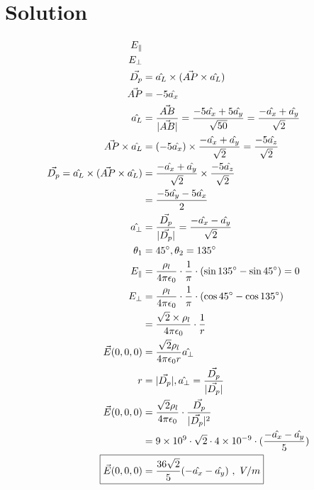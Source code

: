 \documentclass[12pt]{article}
\begin{document}
\section*{Solution}
\[
\begin{aligned}
    E_{\parallel} \\
    E_{\perp} \\
    \vec{D_p} &= \hat{a_L} \times (\vec{AP} \times \hat{a_L}) \\
    \vec{AP} &= -5\hat{a_x} \\
    \hat{a_L} &= \frac{\vec{AB}}{|\vec{AB}|} = \frac{-5\hat{a_x}+5\hat{a_y}}{\sqrt{50}} = \frac{-\hat{a_x}+\hat{a_y}}{\sqrt{2}} \\
    \vec{AP} \times \hat{a_L} &= (-5\hat{a_x}) \times \frac{-\hat{a_x}+\hat{a_y}}{\sqrt{2}} = \frac{-5\hat{a_z}}{\sqrt{2}} \\
    \vec{D_p} = \hat{a_L} \times (\vec{AP} \times \hat{a_L}) &= \frac{-\hat{a_x}+\hat{a_y}}{\sqrt{2}} \times \frac{-5\hat{a_z}}{\sqrt{2}} \\
    &= \frac{-5\hat{a_y}-5\hat{a_x}}{2} \\
    \hat{a_\perp} &= \frac{\vec{D_p}}{|\vec{D_p}|} = \frac{-\hat{a_x}-\hat{a_y}}{\sqrt{2}} \\
    \theta_1 &= 45^{\circ}, \theta_2 = 135^{\circ} \\
    E_{\parallel} &= \frac{\rho_l}{4\pi\epsilon_0}\cdot\frac{1}{\pi}\cdot(\sin{135^{\circ}}-\sin{45^{\circ}}) = 0 \\
    E_{\perp} &= \frac{\rho_l}{4\pi\epsilon_0}\cdot\frac{1}{\pi}\cdot(\cos{45^{\circ}}-\cos{135^{\circ}}) \\
    &= \frac{\sqrt{2} \times \rho_l}{4\pi\epsilon_0}\cdot\frac{1}{r} \\
    \vec{E}(0,0,0) &= \frac{\sqrt{2}\rho_l}{4\pi\epsilon_0r} \hat{a_\perp} \\
    r &= |\vec{D_p}|, \hat{a_\perp} = \frac{\vec{D_p}}{|\vec{D_p}|} \\
    \vec{E}(0,0,0) &= \frac{\sqrt{2}\rho_l}{4\pi\epsilon_0}\cdot\frac{\vec{D_p}}{|\vec{D_p}|^2} \\
    &= 9 \times 10^9 \cdot \sqrt{2} \cdot 4 \times 10^{-9} \cdot (\frac{-\hat{a_x}-\hat{a_y}}{5}) \\
    \Aboxed{\vec{E}(0,0,0) &= \frac{36\sqrt{2}}{5}(-\hat{a_x}-\hat{a_y})~,~V/m}
\end{aligned}
\]
\end{document}
